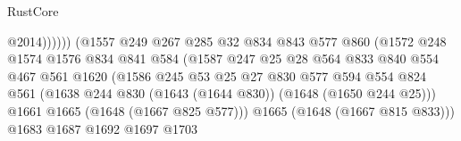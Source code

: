 \begin{lexlean}{RustCore}
\begin{coremodule}
                                                @2014))))))
                                    (@1557
                                      @249
                                      @267
                                      @285
                                      @32
                                      @834
                                      @843
                                      @577
                                      @860
                                      (@1572
                                        @248
                                        @1574
                                        @1576
                                        @834
                                        @841
                                        @584
                                        (@1587
                                          @247
                                          @25
                                          @28
                                          @564
                                          @833
                                          @840
                                          @554
                                          @467
                                          @561
                                          @1620
                                          (@1586
                                            @245
                                            @53
                                            @25
                                            @27
                                            @830
                                            @577
                                            @594
                                            @554
                                            @824
                                            @561
                                            (@1638
                                              @244
                                              @830
                                              (@1643 (@1644 @830))
                                              (@1648 (@1650 @244 @25)))
                                            @1661
                                            @1665
                                            (@1648 (@1667 @825 @577)))
                                          @1665
                                          (@1648 (@1667 @815 @833)))
                                        @1683
                                        @1687
                                        @1692
                                        @1697
                                        @1703

\end{coremodule}
\end{lexlean}
